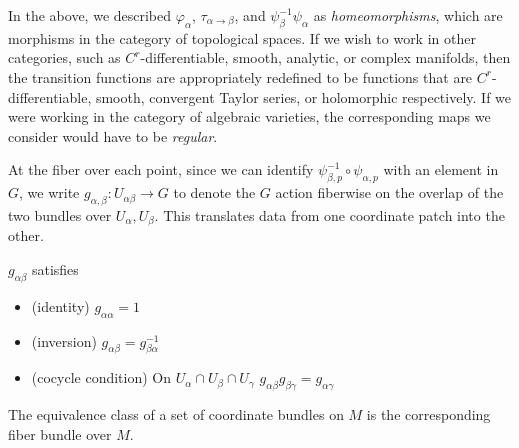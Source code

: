 	\begin{nb}
		In the above, we described $\varphi_\alpha$, $\tau_{\alpha \to \beta}$, and $\psi_\beta^{-1} \psi_\alpha$ as \emph{homeomorphisms}, which are morphisms in the category of topological spaces. If we wish to work in other categories, such as $C^r$-differentiable, smooth, analytic, or complex manifolds, then the transition functions are appropriately redefined to be functions that are $C^r$-differentiable, smooth, convergent Taylor series, or holomorphic respectively. 
		If we were working in the category of algebraic varieties, the corresponding maps we consider would have to be \emph{regular}.
	\end{nb}	
		
		At the fiber over each point, since we can identify $\psi^{-1}_{\beta, p} \circ \psi_{\alpha, p}$ with an element in $G$, we write $g_{\alpha, \beta}: U_{\alpha \beta} \rightarrow G$ to denote the $G$ action fiberwise on the overlap of the two bundles over $U_\alpha, U_\beta$. This translates data from one coordinate patch into the other.
		\begin{prop}
			$g_{\alpha \beta}$ satisfies 
			\begin{itemize}
				\item (identity) $g_{\alpha \alpha} = 1$
				\item (inversion) $g_{\alpha \beta} = g^{-1}_{\beta \alpha}$
				\item (cocycle condition) On $U_\alpha \cap U_\beta \cap U_\gamma$ $g_{\alpha \beta} g_{\beta \gamma} = g_{\alpha \gamma}$
			\end{itemize}
			\label{prop:cocycle}
		\end{prop}
%
%
%
		The equivalence class of a set of coordinate bundles on $M$ is the corresponding fiber bundle over $M$.
		
